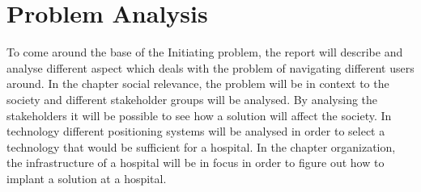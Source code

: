 \chapter{Problem Analysis} \label{cha:problem_analysis}

To come around the base of the Initiating problem, the report will describe and analyse different aspect which deals with the problem of navigating different users around. In the chapter social relevance, the problem will be in context to the society and different stakeholder groups will be analysed. By analysing the stakeholders it will be possible to see how a solution will affect the society. In technology different positioning systems will be analysed in order to select a technology that would be sufficient for a hospital. In the chapter organization, the infrastructure of a hospital will be in focus in order to figure out how to implant a solution at a hospital.












